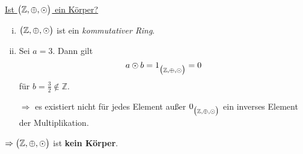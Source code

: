 \documentclass{scrreprt}
\begin{document}
\underline{Ist $\qty\big(\mathbb{Z}, \oplus, \odot)$ ein Körper?}
\begin{enumerate}[(i)]
\item $\qty\big(\mathbb{Z}, \oplus, \odot)$ ist ein \emph{kommutativer Ring}.
\item Sei $a = 3$.
  Dann gilt
  \[
    a \odot b = 1_{\qty\big(\mathbb{Z}, \oplus, \odot)} = 0
  \]
  für $b = \frac{3}{2} \notin \mathbb{Z}$.

  $\Rightarrow$ es existiert nicht für jedes Element außer
  $0_{\qty\big(\mathbb{Z}, \oplus, \odot)}$ ein inverses Element
  der Multiplikation.
\end{enumerate}
$\Rightarrow \qty\big(\mathbb{Z}, \oplus, \odot)$ ist \textbf{kein Körper}.
\end{document}
